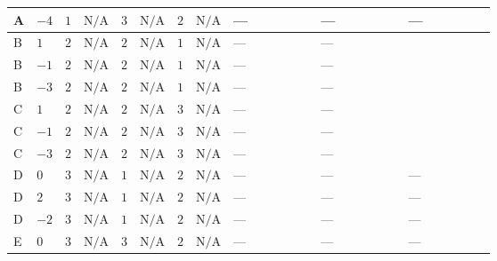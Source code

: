 \documentclass[8pt]{article}
\begin{document}
\begin{landscape}
\begin{longtable}{@{}llcccccc >{\raggedright\arraybackslash}p{0.21\linewidth} >{\raggedright\arraybackslash}p{0.21\linewidth} >{\raggedright\arraybackslash}p{0.21\linewidth}@{}}
\midrule
A & $-4$ & $1$ & $\text{N/A}$ & $3$ & $\text{N/A}$ & $2$ & $\text{N/A}$ & --- & --- & --- \\
\midrule
B & $1$ & $2$ & $\text{N/A}$ & $2$ & $\text{N/A}$ & $1$ & $\text{N/A}$ & --- & --- & \scriptsize\adjustbox{max width=\linewidth}{$\begin{gathered} \frac{9 {g_2}^4}{4}\end{gathered}$} \\
\midrule
B & $-1$ & $2$ & $\text{N/A}$ & $2$ & $\text{N/A}$ & $1$ & $\text{N/A}$ & --- & --- & \scriptsize\adjustbox{max width=\linewidth}{$\begin{gathered} +\frac{9 {g_2}^4}{4}\end{gathered}$} \\
\midrule
B & $-3$ & $2$ & $\text{N/A}$ & $2$ & $\text{N/A}$ & $1$ & $\text{N/A}$ & --- & --- & \scriptsize\adjustbox{max width=\linewidth}{$\begin{gathered} +\frac{9 {g_2}^4}{4}\end{gathered}$} \\
\midrule
C & $1$ & $2$ & $\text{N/A}$ & $2$ & $\text{N/A}$ & $3$ & $\text{N/A}$ & --- & --- & \scriptsize\adjustbox{max width=\linewidth}{$\begin{gathered} \frac{9 {g_2}^4}{4}\end{gathered}$} \\
\midrule
C & $-1$ & $2$ & $\text{N/A}$ & $2$ & $\text{N/A}$ & $3$ & $\text{N/A}$ & --- & --- & \scriptsize\adjustbox{max width=\linewidth}{$\begin{gathered} +\frac{9 {g_2}^4}{4}\end{gathered}$} \\
\midrule
C & $-3$ & $2$ & $\text{N/A}$ & $2$ & $\text{N/A}$ & $3$ & $\text{N/A}$ & --- & --- & \scriptsize\adjustbox{max width=\linewidth}{$\begin{gathered} +\frac{9 {g_2}^4}{4}\end{gathered}$} \\
\midrule
D & $0$ & $3$ & $\text{N/A}$ & $1$ & $\text{N/A}$ & $2$ & $\text{N/A}$ & --- & --- & --- \\
\midrule
D & $2$ & $3$ & $\text{N/A}$ & $1$ & $\text{N/A}$ & $2$ & $\text{N/A}$ & --- & --- & --- \\
\midrule
D & $-2$ & $3$ & $\text{N/A}$ & $1$ & $\text{N/A}$ & $2$ & $\text{N/A}$ & --- & --- & --- \\
\midrule
E & $0$ & $3$ & $\text{N/A}$ & $3$ & $\text{N/A}$ & $2$ & $\text{N/A}$ & --- & --- & --- \\

\end{longtable}
\end{landscape}
\end{document}
